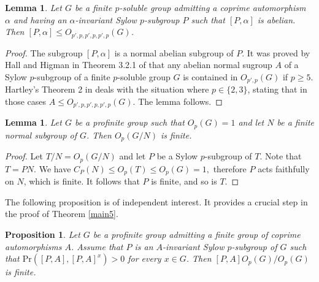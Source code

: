 \documentclass[12pt]{amsart}
\newtheorem{lemma}[theorem]{\bf Lemma}
\newtheorem{proposition}[theorem]{\bf Proposition}
\newcommand{\al }{\alpha }
\newcommand{\pr }{\mathrm{Pr} }
\begin{document}
\begin{lemma}\label{Oppp} Let $G$ be a finite $p$-soluble group admitting a coprime automorphism $\al$ and having an $\al$-invariant Sylow $p$-subgroup $P$  such that $[P,\alpha]$ is abelian. Then $[P,\alpha]\le O_{p',p,p',p,p',p}(G)$.
\end{lemma}

\begin{proof} The subgroup $[P,\alpha]$ is a normal abelian subgroup of $P$. It was proved by Hall and Higman in  Theorem 3.2.1 of \cite{HH} that any abelian normal sugroup $A$ of a Sylow $p$-subgroup of a finite $p$-soluble group $G$ is contained in $O_{p',p}(G)$ if $p\ge 5$. Hartley's Theorem 2 in \cite{Har} deals with the situation where $p\in\{2,3\}$, stating that in those cases $A\le O_{p',p,p',p,p',p}(G)$. The lemma follows.
\end{proof}


\begin{lemma}\label{Op_finite} Let $G$ be a profinite group such that $O_p(G)=1$ and let $N$ be a finite normal subgroup of $G$. Then $O_p(G/N)$ is finite. \end{lemma}

\begin{proof} Let $T/N=O_p(G/N)$ and let $P$ be a Sylow $p$-subgroup of $T$. Note that $T=PN$. We have $C_P(N)\le O_p(T)\le O_p(G)=1,$ therefore $P$ acts faithfully on $N$, which is finite. It follows that $P$ is finite, and so is $T$.
\end{proof}

The following proposition is of independent interest. It provides a crucial step in the proof of Theorem \ref{main5}.

\begin{proposition}\label{main4}
Let $G$ be a profinite group admitting a finite group of coprime automorphisms $A$. Assume that $P$ is an $A$-invariant Sylow $p$-subgroup of $G$ such that $\pr([P,A],[P,A]^x)>0$ for every $x\in G$. Then $[P,A]O_p(G)/O_p(G)$ is finite.
 \end{proposition} 
\end{document}
